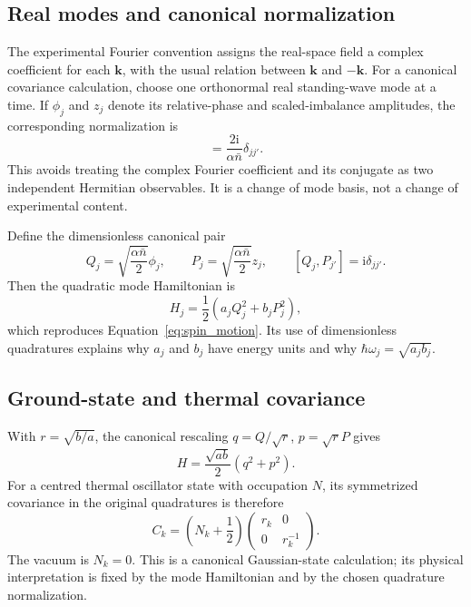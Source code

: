 \documentclass[11pt,a4paper]{article}
\theoremstyle{definition}
\theoremstyle{remark}
\newcommand{\ii}{\mathrm{i}}
\newcommand{\nb}{\bar n}
\begin{document}
\subsection{Real modes and canonical normalization}
The experimental Fourier convention assigns the real-space field a complex coefficient for each $\boldsymbol k$, with the usual relation between $\boldsymbol k$ and $-\boldsymbol k$. For a canonical covariance calculation, choose one orthonormal real standing-wave mode at a time. If $\phi_j$ and $z_j$ denote its relative-phase and scaled-imbalance amplitudes, the corresponding normalization is
\begin{equation}
 [\phi_j,z_{j'}]=\frac{2\ii}{\alpha\nb}\delta_{jj'}.
 \label{eq:commutator}
\end{equation}
This avoids treating the complex Fourier coefficient and its conjugate as two independent Hermitian observables. It is a change of mode basis, not a change of experimental content.\cite{zhang2026}

Define the dimensionless canonical pair
\begin{equation}
 Q_j=\sqrt{\frac{\alpha\nb}{2}}\phi_j,
 \qquad P_j=\sqrt{\frac{\alpha\nb}{2}}z_j,
 \qquad [Q_j,P_{j'}]=\ii\delta_{jj'}.
 \label{eq:QP}
\end{equation}
Then the quadratic mode Hamiltonian is
\begin{equation}
 H_j=\frac12\left(a_jQ_j^2+b_jP_j^2\right),
 \label{eq:Hmode}
\end{equation}
which reproduces Equation~\eqref{eq:spin_motion}. Its use of dimensionless quadratures explains why $a_j$ and $b_j$ have energy units and why $\hbar\omega_j=\sqrt{a_jb_j}$.

\subsection{Ground-state and thermal covariance}
With $r=\sqrt{b/a}$, the canonical rescaling $q=Q/\sqrt r$, $p=\sqrt r P$ gives
\begin{equation}
 H=\frac{\sqrt{ab}}{2}(q^2+p^2).
 \label{eq:isotropicH}
\end{equation}
For a centred thermal oscillator state with occupation $N$, its symmetrized covariance in the original quadratures is therefore
\begin{equation}
 C_k=\left(N_k+\frac12\right)
 \begin{pmatrix}r_k&0\\0&r_k^{-1}\end{pmatrix}.
 \label{eq:covariance}
\end{equation}
The vacuum is $N_k=0$. This is a canonical Gaussian-state calculation; its physical interpretation is fixed by the mode Hamiltonian and by the chosen quadrature normalization.\cite{weedbrook}
\end{document}
